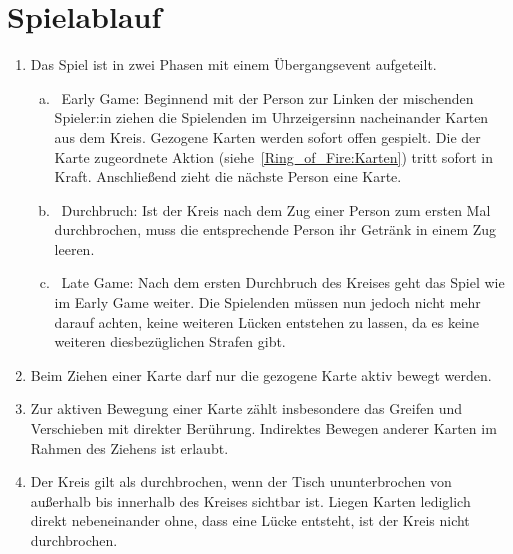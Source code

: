 \section{Spielablauf}
\begin{enumerate}[label={(\arabic*)}]
	\item
	Das Spiel ist in zwei Phasen mit einem Übergangsevent aufgeteilt.
	\begin{enumerate}[a.]
		\item
~\glqq{}Early Game\grqq{}:
		Beginnend mit der Person zur Linken der mischenden Spieler:in ziehen die Spielenden im Uhrzeigersinn nacheinander Karten aus dem Kreis.
		Gezogene Karten werden sofort offen gespielt.
		Die der Karte zugeordnete Aktion (siehe~\ref{Ring_of_Fire:Karten}) tritt sofort in Kraft.
		Anschließend zieht die nächste Person eine Karte.
		\item
~\glqq{}Durchbruch\grqq{}:
		Ist der Kreis nach dem Zug einer Person zum ersten Mal durchbrochen, muss die entsprechende Person ihr Getränk in einem Zug leeren.
		\item
~\glqq{}Late Game\grqq{}:
		Nach dem ersten Durchbruch des Kreises geht das Spiel wie im Early Game weiter.
		Die Spielenden müssen nun jedoch nicht mehr darauf achten, keine weiteren Lücken entstehen zu lassen, da es keine weiteren diesbezüglichen Strafen gibt.
	\end{enumerate}

	\item
	Beim Ziehen einer Karte darf nur die gezogene Karte aktiv bewegt werden.

	\item
	Zur aktiven Bewegung einer Karte zählt insbesondere das Greifen und Verschieben mit direkter Berührung.
	Indirektes Bewegen anderer Karten im Rahmen des Ziehens ist erlaubt.

	\item
	Der Kreis gilt als durchbrochen, wenn der Tisch ununterbrochen von außerhalb bis innerhalb des Kreises sichtbar ist.
	Liegen Karten lediglich direkt nebeneinander ohne, dass eine Lücke entsteht, ist der Kreis nicht durchbrochen.
\end{enumerate}

